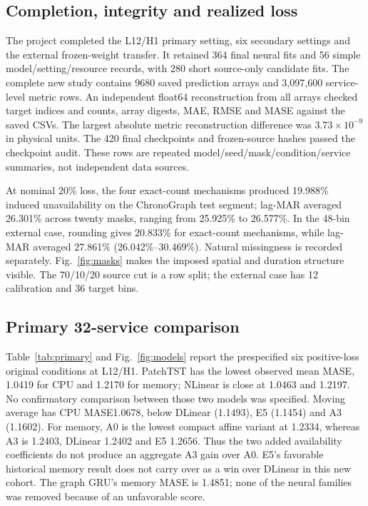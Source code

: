 
\subsection{Completion, integrity and realized loss}\label{sec:completion}
The project completed the L12/H1 primary setting, six secondary settings and the external frozen-weight transfer. It retained 364 final neural fits and 56 simple model/setting/resource records, with 280 short source-only candidate fits. The complete new study contains 9680 saved prediction arrays and 3,097,600 service-level metric rows. An independent float64 reconstruction from all arrays checked target indices and counts, array digests, MAE, RMSE and MASE against the saved CSVs. The largest absolute metric reconstruction difference was $3.73\times10^{-9}$ in physical units. The 420 final checkpoints and frozen-source hashes passed the checkpoint audit. These rows are repeated model/seed/mask/condition/service summaries, not independent data sources.

At nominal 20\% loss, the four exact-count mechanisms produced 19.988\% induced unavailability on the ChronoGraph test segment; lag-MAR averaged 26.301\% across twenty masks, ranging from 25.925\% to 26.577\%. In the 48-bin external case, rounding gives 20.833\% for exact-count mechanisms, while lag-MAR averaged 27.861\% (26.042\%--30.469\%). Natural missingness is recorded separately. Fig.~\ref{fig:masks} makes the imposed spatial and duration structure visible. The 70/10/20 source cut is a row split; the external case has 12 calibration and 36 target bins.

\subsection{Primary 32-service comparison}
Table~\ref{tab:primary} and Fig.~\ref{fig:models} report the prespecified six positive-loss original conditions at L12/H1. PatchTST has the lowest observed mean MASE, 1.0419 for CPU and 1.2170 for memory; NLinear is close at 1.0463 and 1.2197. No confirmatory comparison between those two models was specified. Moving average has CPU MASE1.0678, below DLinear (1.1493), E5 (1.1454) and A3 (1.1602). For memory, A0 is the lowest compact affine variant at 1.2334, whereas A3 is 1.2403, DLinear 1.2402 and E5 1.2656. Thus the two added availability coefficients do not produce an aggregate A3 gain over A0. E5's favorable historical memory result does not carry over as a win over DLinear in this new cohort. The graph GRU's memory MASE is 1.4851; none of the neural families was removed because of an unfavorable score.


